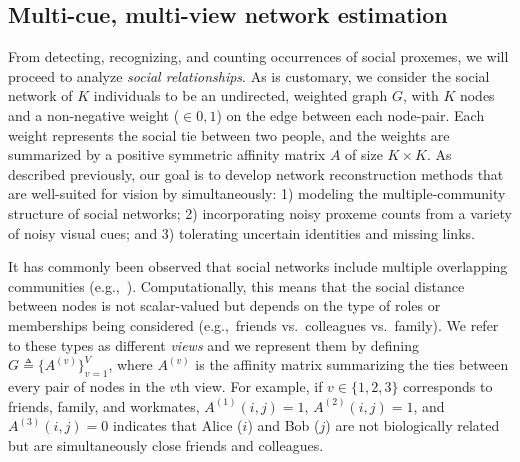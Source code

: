 
\subsection{Multi-cue, multi-view network estimation}
\label{sec:vis2net}
\vspace{-5pt}

From detecting, recognizing, and counting occurrences of social proxemes, we will proceed to analyze \emph{social relationships}. As is customary, we consider the social network of $K$ individuals to be an undirected, weighted graph $G$, with $K$ nodes and a non-negative weight ($\in {0,1}$) on the edge between each node-pair. Each weight represents the social tie between two people, and the weights are summarized by a positive symmetric affinity matrix $A$ of size $K\times K$. As described previously, our goal is to develop network reconstruction methods that are well-suited for vision by simultaneously: 1) modeling the multiple-community structure of social networks; 2) incorporating noisy proxeme counts from a variety of noisy visual cues; and 3) tolerating uncertain identities and missing links.

It has commonly been observed that social networks include multiple overlapping communities (e.g.,~\cite{AiroldiBFX08,Kim12}). Computationally, this means that the social distance between nodes is not scalar-valued but depends on the type of roles or memberships being considered (e.g.,~friends vs.~colleagues vs.~family). We refer to these types as different \emph{views} and we represent them by defining $G\triangleq\{A^{(v)}\}_{v=1}^{V}$, where $A^{(v)}$ is the affinity matrix summarizing the ties between every pair of nodes in the $v$th view. For example, if $v\in\{1,2,3\}$ corresponds to friends, family, and workmates,  $A^{(1)}(i,j)=1$, $A^{(2)}(i,j)=1$, and $A^{(3)}(i,j)=0$ indicates that Alice ($i$) and Bob ($j$) are not biologically related but are simultaneously close friends and colleagues. 

